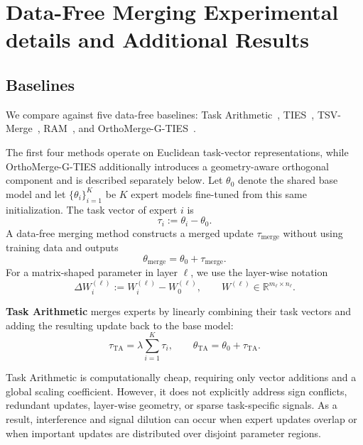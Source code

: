 \documentclass[11pt, a4paper]{utda}
\theoremstyle{plain}
\theoremstyle{definition}
\theoremstyle{remark}
\newcommand{\R}{\mathbb{R}}
\providecommand{\R}{\mathbb{R}}
\providecommand{\merge}{\mathrm{merge}}
\providecommand{\TA}{\mathrm{TA}}
\begin{document}
\section{Data-Free Merging Experimental details and Additional Results}
\label{app:merging_details}

\subsection{Baselines}

We compare against five data-free baselines: Task Arithmetic~\cite{ta}, TIES~\cite{ties}, TSV-Merge~\cite{tsv}, RAM~\cite{ram}, and OrthoMerge-G-TIES~\cite{yang2026orthogonal}.

The first four methods operate on Euclidean task-vector representations, while OrthoMerge-G-TIES additionally introduces a geometry-aware orthogonal component and is described separately below. Let $\theta_0$ denote the shared base model and
let $\{\theta_i\}_{i=1}^{K}$ be $K$ expert models fine-tuned from this same
initialization. The task vector of expert $i$ is
\begin{equation}
    \tau_i := \theta_i-\theta_0.
\end{equation}
A data-free merging method constructs a merged update $\tau_{\merge}$ without
using training data and outputs
\begin{equation}
    \theta_{\merge} = \theta_0+\tau_{\merge}.
\end{equation}
For a matrix-shaped parameter in layer $\ell$, we use the layer-wise notation
\begin{equation}
    \Delta W_i^{(\ell)}
    :=
    W_i^{(\ell)}-W_0^{(\ell)},
    \qquad W^{(\ell)} \in \R^{m_\ell \times n_\ell}.
\end{equation}


\textbf{Task Arithmetic} merges experts by linearly combining their task vectors and
adding the resulting update back to the base model:
\begin{equation}
    \tau_{\TA} = \lambda \sum_{i=1}^{K} \tau_i,
    \qquad
    \theta_{\TA} = \theta_0+\tau_{\TA}.
\end{equation}



Task Arithmetic is computationally cheap, requiring only vector additions and
a global scaling coefficient. However, it does not explicitly address sign
conflicts, redundant updates, layer-wise geometry, or sparse task-specific
signals. As a result, interference and signal dilution can occur when expert
updates overlap or when important updates are distributed over disjoint parameter
regions.
\end{document}
